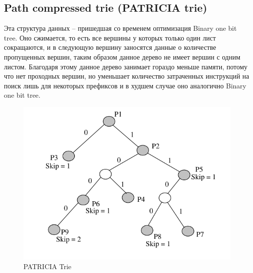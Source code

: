 \documentclass[a4peper, 12pt, titlepage, finall]{extreport}
\begin{document}
        \subsection{Path compressed trie (PATRICIA trie)}
            Эта структура данных -- пришедшая со временем оптимизация Binary one bit tree. Оно сжимается, 
            то есть все вершины у которых только один лист сокращаются, и в следующую вершину заносятся данные о 
            количестве пропущенных вершин, таким образом данное дерево не имеет вершин с одним листом. Благодаря этому данное дерево
            занимает гораздо меньше памяти, потому что нет проходных вершин, но уменьшает количество затраченных инструкций на поиск лишь 
            для некоторых префиксов и в худшем случае оно аналогично Binary one bit tree.

            \begin{figure}[h]
                \includegraphics[width=\textwidth]{patricia_trie.png}
                \caption{PATRICIA Trie}
                \label{fig:mesh2}
            \end{figure}
\end{document}
